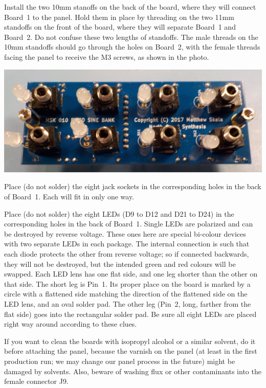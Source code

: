 Install the two 10mm stanoffs on the back of the board, where they will
connect Board~1 to the panel.  Hold them in place by threading on the two
11mm standoffs on the front of the board, where they will separate Board~1 and
Board~2.  Do not confuse these two lengths of standoffs.  The male threads on
the 10mm standoffs should go through the holes on Board~2, with the female
threads facing the panel to receive the M3 screws, as shown in the photo.

\noindent\includegraphics[width=\linewidth]{leds-jacks.jpg}

Place (do not solder) the eight jack sockets in the corresponding holes in
the back of Board~1.  Each will fit in only one way.

Place (do not solder) the eight LEDs (D9 to D12 and D21 to D24) in the
corresponding holes in the back of Board~1.  Single LEDs are polarized and
can be destroyed by reverse voltage.  These ones here are special bi-colour
devices with two separate LEDs in each package.  The internal connection is
such that each diode protects the other from reverse voltage; so if connected
backwards, they will not be destroyed, but the intended green and red
colours will be swapped.  Each LED lens has one flat side, and one leg
shorter than the other on that side.  The short leg is Pin~1.  Its proper
place on the board is marked by a circle with a flattened side matching the
direction of the flattened side on the LED lens, and an oval solder pad. 
The other leg (Pin~2, long, farther from the flat side) goes into the
rectangular solder pad.  Be sure all eight LEDs are placed right way around
according to these clues.

If you want to clean the boards with isopropyl alcohol or a similar solvent,
do it before attaching the panel, because the varnish on the panel (at least
in the first production run; we may change our panel process in the future)
might be damaged by solvents.  Also, beware of washing flux or other
contaminants into the female connector J9.

